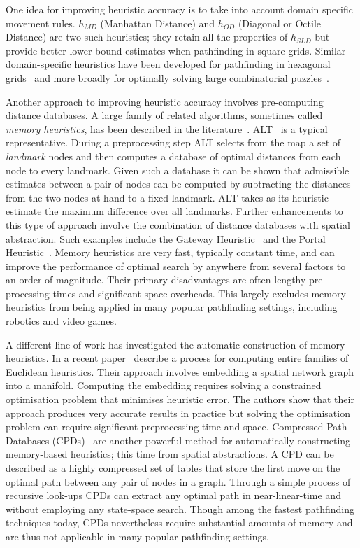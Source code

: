 One idea for improving heuristic accuracy is to take into account domain specific movement rules.
$h_{MD}$ (Manhattan Distance) and $h_{OD}$ (Diagonal or Octile Distance) are two such heuristics; they
retain all the properties of $h_{SLD}$ but provide better lower-bound estimates when pathfinding in
square grids. Similar domain-specific heuristics have been developed for pathfinding in hexagonal
grids~\citep{yap02} and more broadly for optimally solving large combinatorial puzzles~\citep{korf96}.

Another approach to improving heuristic accuracy involves pre-computing distance databases.  A
large family of related algorithms, sometimes called \emph{memory heuristics}, has been described in
the literature~\citep{goldberg05,bjornsson06,sturtevant07,felner09,goldenberg10,anderson10}.
ALT~\citep{goldberg05} is a typical representative. During a preprocessing step ALT selects from the
map a set of \emph{landmark} nodes and then computes a database of optimal distances from each node
to every landmark. Given such a database it can be shown that admissible estimates between a pair
of nodes can be computed by subtracting the distances from the two nodes at hand to a fixed landmark.
ALT takes as its heuristic estimate the maximum difference over all landmarks.  
Further enhancements to this type of approach involve the combination of distance databases with
spatial abstraction. Such examples include the Gateway Heuristic~\citep{bjornsson06} and the 
Portal Heuristic~\citep{goldenberg10}. Memory heuristics are very fast, typically constant time, 
and can improve the performance of optimal search by anywhere from several factors to an order of
magnitude. Their primary disadvantages are often lengthy pre-processing times and significant space
overheads.  This largely excludes memory heuristics from being applied in many popular pathfinding
settings, including robotics and video games.

A different line of work has investigated the automatic construction of memory heuristics.  In a
recent paper~\cite{rayner11} describe a process for computing entire families of Euclidean
heuristics. Their approach involves embedding a spatial network graph into a manifold. Computing the
embedding requires solving a constrained optimisation problem that minimises heuristic error. The
authors show that their approach produces very accurate results in practice but solving the
optimisation problem can require significant preprocessing time and space.  Compressed Path
Databases (CPDs)~\citep{sanka05,botea11,botea13} are another powerful method for automatically
constructing memory-based heuristics; this time from spatial abstractions.  A CPD can be described as
a highly compressed set of tables that store the first move on the optimal path between any pair of
nodes in a graph. Through a simple process of recursive look-ups CPDs can extract any optimal path in
near-linear-time and without employing any state-space search. Though among the fastest pathfinding
techniques today, CPDs nevertheless require substantial amounts of memory and are thus not
applicable in many popular pathfinding settings.

